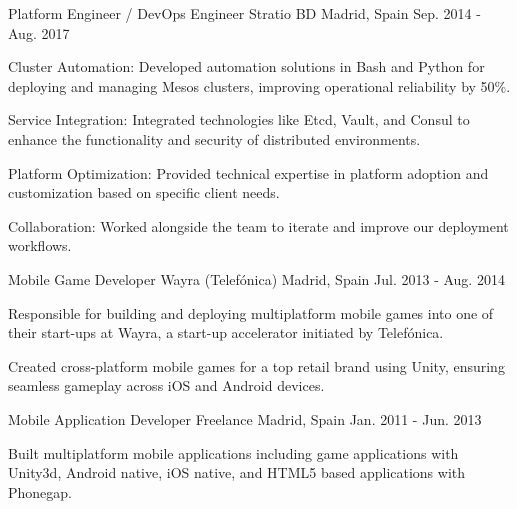 \begin{cventries}
  \cventry
    {Platform Engineer / DevOps Engineer} %
    {Stratio BD} %
    {Madrid, Spain} %
    {Sep. 2014 - Aug. 2017} %
    {
      \begin{cvitems} %
        \item {Cluster Automation: Developed automation solutions in Bash and Python for deploying and managing Mesos clusters, improving operational reliability by 50\%.}
        \item {Service Integration: Integrated technologies like Etcd, Vault, and Consul to enhance the functionality and security of distributed environments.}
        \item {Platform Optimization: Provided technical expertise in platform adoption and customization based on specific client needs.}
        \item {Collaboration: Worked alongside the team to iterate and improve our deployment workflows.}
      \end{cvitems}
    }

  \cventry
    {Mobile Game Developer} %
    {Wayra (Telefónica)} %
    {Madrid, Spain} %
    {Jul. 2013 - Aug. 2014} %
    {
      \begin{cvitems} %
        \item {Responsible for building and deploying multiplatform mobile games into one of their start-ups at Wayra, a start-up accelerator initiated by Telefónica.}
        \item {Created cross-platform mobile games for a top retail brand using Unity, ensuring seamless gameplay across iOS and Android devices.}
      \end{cvitems}
    }

  \cventry
    {Mobile Application Developer} %
    {Freelance} %
    {Madrid, Spain} %
    {Jan. 2011 - Jun. 2013} %
    {
      \begin{cvitems} %
        \item {Built multiplatform mobile applications including game applications with Unity3d, Android native, iOS native, and HTML5 based applications with Phonegap.}
      \end{cvitems}
    }

\end{cventries}
